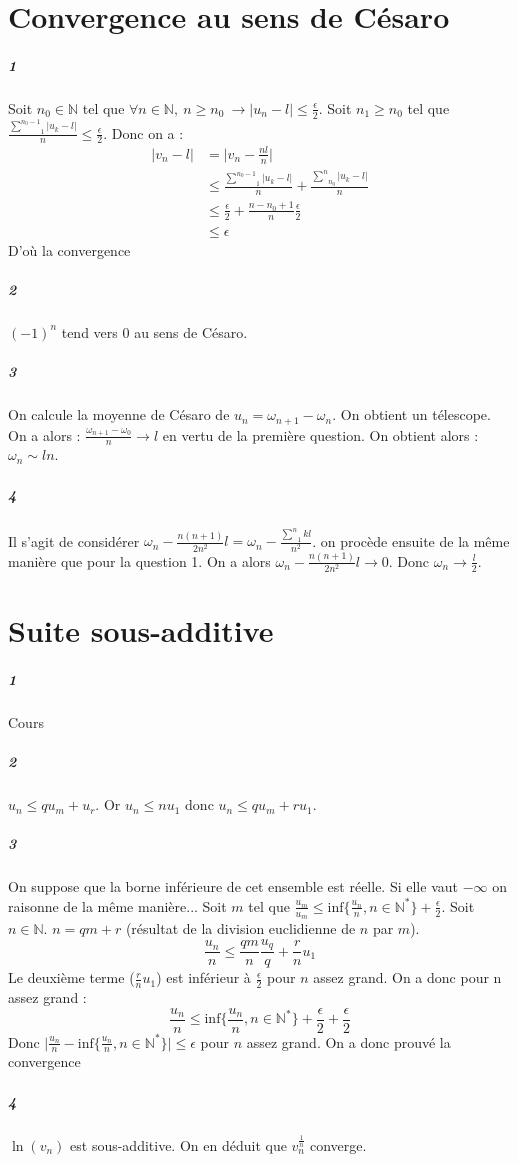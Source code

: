 \documentclass[10pt,a4paper]{article}
\begin{document}
\section{Convergence au sens de Césaro}
\subparagraph{1}Soit $n_0 \in \mathbb{N}$ tel que $\forall n \in \mathbb{N}, \ n \ge n_0 \ \rightarrow \vert u_n -l \vert \le \frac{\epsilon}{2}$. Soit $n_1\ge n_0$ tel que $\frac{\underset{1}{\overset{n_0-1}{\sum}} \vert u_k -l \vert }{n}\le \frac{\epsilon}{2}$. Donc on a :
\begin{equation}
\begin{aligned}
\vert v_n -l \vert &= \vert v_n - \frac{nl}{n}\vert \\
&\le \frac{\underset{1}{\overset{n_0-1}{\sum}} \vert u_k -l \vert }{n}+\frac{\underset{n_0}{\overset{n}{\sum}} \vert u_k -l \vert }{n}\\
&\le \frac{\epsilon}{2}+\frac{n-n_0+1}{n} \frac{\epsilon}{2} \\
&\le \epsilon
\end{aligned}
\end{equation}
D'où la convergence
\subparagraph{2}$(-1)^n$ tend vers $0$ au sens de Césaro.
\subparagraph{3}On calcule la moyenne de Césaro de $u_n=\omega_{n+1}-\omega_n$. On obtient un télescope. On a alors : $\frac{\omega_{n+1}-\omega_0}{n} \rightarrow l$ en vertu de la première question. On obtient alors : $\omega_n \sim l n$.
\subparagraph{4}Il s'agit de considérer $\omega_n - \frac{n(n+1)}{2n^2}l = \omega_n - \frac{\underset{1}{\overset{n}{\sum}}k l}{n^2}$. on procède ensuite de la même manière que pour la question 1. On a alors $\omega_n- \frac{n(n+1)}{2n^2}l \rightarrow 0$. Donc $\omega_n \rightarrow \frac{l}{2}$.

\section{Suite sous-additive}
\subparagraph{1}Cours
\subparagraph{2}$u_n \le q u_m + u_r$. Or $u_n \le n u_1$ donc $u_n \le q u_m +r u_1$.
\subparagraph{3}On suppose que la borne inférieure de cet ensemble est réelle. Si elle vaut $-\infty$ on raisonne de la même manière... Soit $m$ tel que $\frac{u_m}{u_m}\le \text{inf}\lbrace \frac{u_n}{n}, n \in \mathbb{N}^*\rbrace +\frac{\epsilon}{2}$. Soit $n \in \mathbb{N}$. $n=qm+r$ (résultat de la division euclidienne de $n$ par $m$).
\begin{equation}
\frac{u_n}{n} \le \frac{qm}{n}\frac{u_q}{q}+\frac{r}{n}u_1
\end{equation}
Le deuxième terme ($\frac{r}{n}u_1$) est inférieur à $\frac{\epsilon}{2}$ pour $n$ assez grand. On a donc pour n assez grand :
\begin{equation}
\frac{u_n}{n} \le \text{inf}\lbrace \frac{u_n}{n}, n \in \mathbb{N}^*\rbrace +\frac{\epsilon}{2}+\frac{\epsilon}{2}
\end{equation}
Donc $\vert \frac{u_n}{n} - \text{inf}\lbrace \frac{u_n}{n}, n \in \mathbb{N}^*\rbrace \vert \le \epsilon$ pour $n$ assez grand. On a donc prouvé la convergence
\subparagraph{4} $\ln(v_n)$ est sous-additive. On en déduit que $v_n^{\frac{1}{n}}$ converge.
\end{document}
